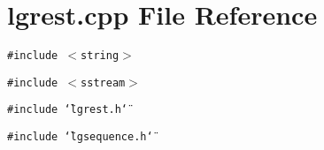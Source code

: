 \section{lgrest.cpp File Reference}
\label{lgrest_8cpp}
{\tt \#include $<$string$>$}\par
{\tt \#include $<$sstream$>$}\par
{\tt \#include \char`\"{}lgrest.h\char`\"{}}\par
{\tt \#include \char`\"{}lgsequence.h\char`\"{}}\par
